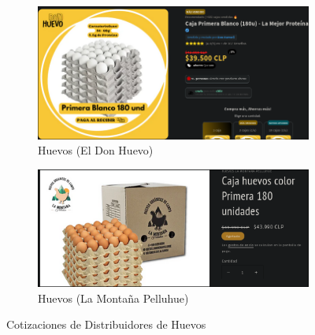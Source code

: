 \documentclass[12pt]{article}
\begin{document}
        \begin{figure}[h!] %
            \centering
            \begin{subfigure}{0.45\textwidth}
                \centering
                \includegraphics[width=0.9\linewidth]{donhuevo} %
                \caption{Huevos (El Don Huevo)}
                \label{fig:don_huevo}
            \end{subfigure}
            \hfill
            \begin{subfigure}{0.45\textwidth}
                \centering
                \includegraphics[width=0.9\linewidth]{montan1} %
                \caption{Huevos (La Montaña Pelluhue)}
                \label{fig:huevos_montaña}
            \end{subfigure}
            \caption{Cotizaciones de Distribuidores de Huevos}
            \label{fig:cotizaciones_huevos}
        \end{figure} %
        \newpage
\end{document}
